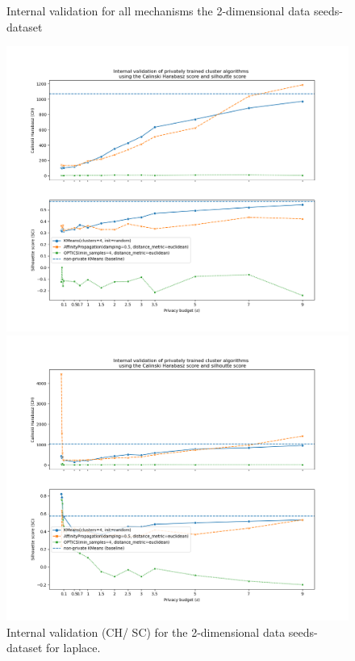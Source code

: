 


\begin{figure}[H]
    \caption{Internal validation for all mechanisms the 2-dimensional data seeds-dataset}
    \centering
    \begin{minipage}[c]{0.49\textwidth}
        \includegraphics[width=1\textwidth]{Results/2d-laplace/seeds-dataset/ch-and-sc.png}
        \caption{Internal validation (CH/ SC) for the 2-dimensional data seeds-dataset for laplace.}
        \label{fig:appendix-internal-validation-seeds-dataset_comparison_2d-laplace}
    \end{minipage}
    \begin{minipage}[c]{0.49\textwidth}
        \includegraphics[width=1\textwidth]{Results/2d-laplace-truncated/seeds-dataset/ch-and-sc.png}

\end{minipage}
\end{figure}
